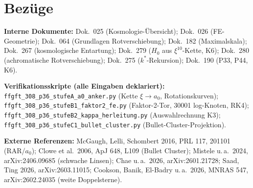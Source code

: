 \chapter{Bezüge}

\textbf{Interne Dokumente:}
Dok.~025 (Kosmologie-Übersicht);
Dok.~026 (FE-Geometrie);
Dok.~064 (Grundlagen Rotverschiebung);
Dok.~182 (Maximalskala);
Dok.~267 (kosmologische Entartung);
Dok.~279 ($H_0$ aus $\xi^{10}$-Kette, K6);
Dok.~280 (achromatische Rotverschiebung);
Dok.~275 ($k^*$-Rekursion);
Dok.~190 (P33, P44, K6).

\medskip
\noindent\textbf{Verifikationsskripte (alle Eingaben deklariert):}
\texttt{ffgft\_308\_p36\_stufeA\_a0\_anker.py}
(Kette $\xi \to a_0$, Rotationskurven);
\texttt{ffgft\_308\_p36\_stufeB1\_faktor2\_fe.py}
(Faktor-2-Tor, 30001 log-Knoten, RK4);
\texttt{ffgft\_308\_p36\_stufeB2\_kappa\_herleitung.py}
(Auswahlrechnung K3);
\texttt{ffgft\_308\_p36\_stufeC1\_bullet\_cluster.py}
(Bullet-Cluster-Projektion).

\medskip
\noindent\textbf{Externe Referenzen:}
McGaugh, Lelli, Schombert 2016, PRL 117, 201101 (RAR/$a_0$);
Clowe et al.\ 2006, ApJ 648, L109 (Bullet Cluster);
Mistele u.\,a.\ 2024, arXiv:2406.09685 (schwache Linsen);
Chae u.\,a.\ 2026, arXiv:2601.21728; Saad, Ting 2026, arXiv:2603.11015;
Cookson, Banik, El-Badry u.\,a.\ 2026, MNRAS 547, arXiv:2602.24035
(weite Doppelsterne).
